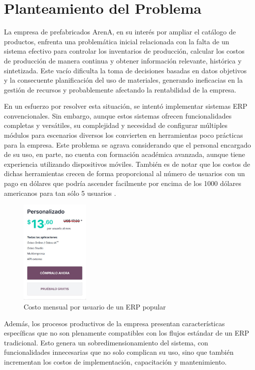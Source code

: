 \section{Planteamiento del Problema} \label{problem_statement}

La empresa de prefabricados ArenA, en su interés por ampliar el catálogo de productos, enfrenta una problemática inicial relacionada con la falta de un sistema efectivo para controlar los inventarios de producción, calcular los costos de producción de manera continua y obtener información relevante, histórica y sintetizada. Este vacío dificulta la toma de decisiones basadas en datos objetivos y la consecuente planificación del uso de materiales, generando ineficacias en la gestión de recursos y probablemente afectando la rentabilidad de la empresa.

En un esfuerzo por resolver esta situación, se intentó implementar sistemas ERP convencionales. Sin embargo, aunque estos sistemas ofrecen funcionalidades completas y versátiles, su complejidad y necesidad de configurar múltiples módulos para escenarios diversos los convierten en herramientas poco prácticas para la empresa. Este problema se agrava considerando que el personal encargado de su uso, en parte, no cuenta con formación académica avanzada, aunque tiene experiencia utilizando dispositivos móviles. También es de notar que los costos de dichas herramientas crecen de forma proporcional al número de usuarios con un pago en dólares que podría ascender facilmente por encima de los 1000 dólares americanos para tan sólo 5 usuarios \cite{martinCleanCodeHandbook2009}.

\begin{figure}[htbp]
    \centering
    \includegraphics[width=0.3\textwidth]{assets/oddopricing.JPG}
    \caption{Costo mensual por usuario de un ERP popular}
    \label{fig:oddopricing}
\end{figure}


Además, los procesos productivos de la empresa presentan características específicas que no son plenamente compatibles con los flujos estándar de un ERP tradicional. Esto genera un sobredimensionamiento del sistema, con funcionalidades innecesarias que no solo complican su uso, sino que también incrementan los costos de implementación, capacitación y mantenimiento.


